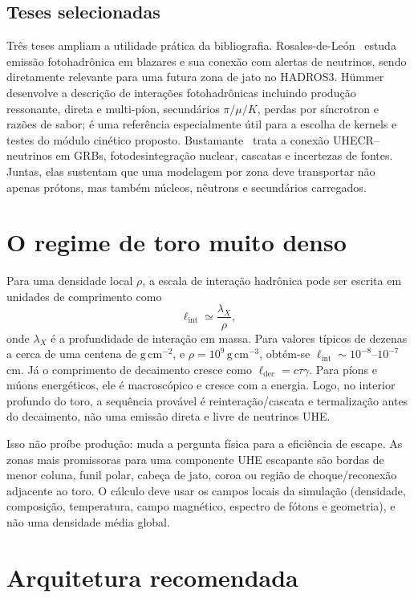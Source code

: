 \documentclass[11pt,a4paper]{article}
\begin{document}
\subsection{Teses selecionadas}

Três teses ampliam a utilidade prática da bibliografia. Rosales-de-León~\cite{RosalesDeLeon2022} estuda emissão fotohadrônica em blazares e sua conexão com alertas de neutrinos, sendo diretamente relevante para uma futura zona de jato no HADROS3. Hümmer~\cite{Hummer2013} desenvolve a descrição de interações fotohadrônicas incluindo produção ressonante, direta e multi-píon, secundários $\pi/\mu/K$, perdas por síncrotron e razões de sabor; é uma referência especialmente útil para a escolha de kernels e testes do módulo cinético proposto. Bustamante~\cite{Bustamante2015} trata a conexão UHECR--neutrinos em GRBs, fotodesintegração nuclear, cascatas e incertezas de fontes. Juntas, elas sustentam que uma modelagem por zona deve transportar não apenas prótons, mas também núcleos, nêutrons e secundários carregados.

\section{O regime de toro muito denso}

Para uma densidade local $\rho$, a escala de interação hadrônica pode ser escrita em unidades de comprimento como
\[
 \ell_{\mathrm{int}} \simeq \frac{\lambda_X}{\rho},
\]
onde $\lambda_X$ é a profundidade de interação em massa. Para valores típicos de dezenas a cerca de uma centena de $\mathrm{g\,cm^{-2}}$, e $\rho=10^9\,\mathrm{g\,cm^{-3}}$, obtém-se $\ell_{\mathrm{int}}\sim10^{-8}$--$10^{-7}\,$cm. Já o comprimento de decaimento cresce como $\ell_{\mathrm{dec}}=c\tau\gamma$. Para píons e múons energéticos, ele é macroscópico e cresce com a energia. Logo, no interior profundo do toro, a sequência provável é reinteração/cascata e termalização antes do decaimento, não uma emissão direta e livre de neutrinos UHE.

Isso não proíbe produção: muda a pergunta física para a eficiência de escape. As zonas mais promissoras para uma componente UHE escapante são bordas de menor coluna, funil polar, cabeça de jato, coroa ou região de choque/reconexão adjacente ao toro. O cálculo deve usar os campos locais da simulação (densidade, composição, temperatura, campo magnético, espectro de fótons e geometria), e não uma densidade média global.

\section{Arquitetura recomendada}
\end{document}
